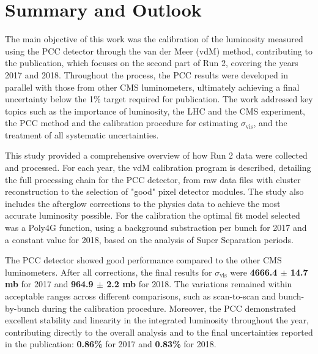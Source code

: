 \chapter{Summary and Outlook}

The main objective of this work was the calibration of the luminosity measured using the PCC detector through the van der Meer (vdM) method, contributing to the publication, which focuses on the second part of Run 2, covering the years 2017 and 2018. Throughout the process, the PCC results were developed in parallel with those from other CMS luminometers, ultimately achieving a final uncertainty below the 1\% target required for publication. The work addressed key topics such as the importance of luminosity, the LHC and the CMS experiment, the PCC method and the calibration procedure for estimating $\sigma_{\text{vis}}$, and the treatment of all systematic uncertainties.

This study provided a comprehensive overview of how Run 2 data were collected and processed. For each year, the vdM calibration program is described, detailing the full processing chain for the PCC detector, from raw data files with cluster reconstruction to the selection of "good" pixel detector modules. The study also includes the afterglow corrections to the physics data to achieve the most accurate luminosity possible. For the calibration the optimal fit model selected was a Poly4G function, using a background substraction per bunch for 2017 and a constant value for 2018, based on the analysis of Super Separation periods.

The PCC detector showed good performance compared to the other CMS luminometers. After all corrections, the final results for $\sigma_{\text{vis}}$ were \textbf{4666.4 $\pm$ 14.7 mb} for 2017 and \textbf{964.9 $\pm$ 2.2 mb} for 2018. The variations remained within acceptable ranges across different comparisons, such as scan-to-scan and bunch-by-bunch during the calibration procedure. Moreover, the PCC demonstrated excellent stability and linearity in the integrated luminosity throughout the year, contributing directly to the overall analysis and to the final uncertainties reported in the publication: \textbf{0.86\%} for 2017 and \textbf{0.83\%} for 2018.




